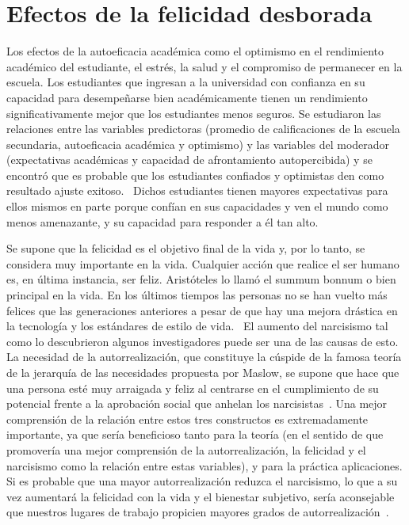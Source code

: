 \documentclass[jou,apacite]{apa6}
\begin{document}
\section{Efectos de la felicidad desborada}
Los efectos de la autoeficacia académica como el optimismo en el rendimiento académico del estudiante, el estrés, la salud y el compromiso de permanecer en la escuela. Los estudiantes que ingresan a la universidad con confianza en su capacidad para desempeñarse bien académicamente tienen un rendimiento significativamente mejor que los estudiantes menos seguros. Se estudiaron las relaciones entre las variables predictoras (promedio de calificaciones de la escuela secundaria, autoeficacia académica y optimismo) y las variables del moderador (expectativas académicas y capacidad de afrontamiento autopercibida) y se encontró que es probable que los estudiantes confiados y optimistas den como resultado ajuste exitoso.~\cite{Martin} Dichos estudiantes tienen mayores expectativas para ellos mismos en parte porque confían en sus capacidades y ven el mundo como menos amenazante, y su capacidad para responder a él tan alto.


Se supone que la felicidad es el objetivo final de la vida y, por lo tanto, se considera muy importante en la vida. Cualquier acción que realice el ser humano es, en última instancia, ser feliz. Aristóteles lo llamó el summum bonnum o bien principal en la vida. En los últimos tiempos las personas no se han vuelto más felices que las generaciones anteriores a pesar de que hay una mejora drástica en la tecnología y los estándares de estilo de vida.~\cite{Vasudha} El aumento del narcisismo tal como lo descubrieron algunos investigadores puede ser una de las causas de esto. La necesidad de la autorrealización, que constituye la cúspide de la famosa teoría de la jerarquía de las necesidades propuesta por Maslow, se supone que hace que una persona esté muy arraigada y feliz al centrarse en el cumplimiento de su potencial frente a la aprobación social que anhelan los narcisistas~\cite{Maslow}. Una mejor comprensión de la relación entre estos tres constructos es extremadamente importante, ya que sería beneficioso tanto para la teoría (en el sentido de que promovería una mejor comprensión de la autorrealización, la felicidad y el narcisismo como la relación entre estas variables), y para la práctica aplicaciones. Si es probable que una mayor autorrealización reduzca el narcisismo, lo que a su vez aumentará la felicidad con la vida y el bienestar subjetivo, sería aconsejable que nuestros lugares de trabajo propicien mayores grados de autorrealización~\cite{Rose}.
\end{document}
